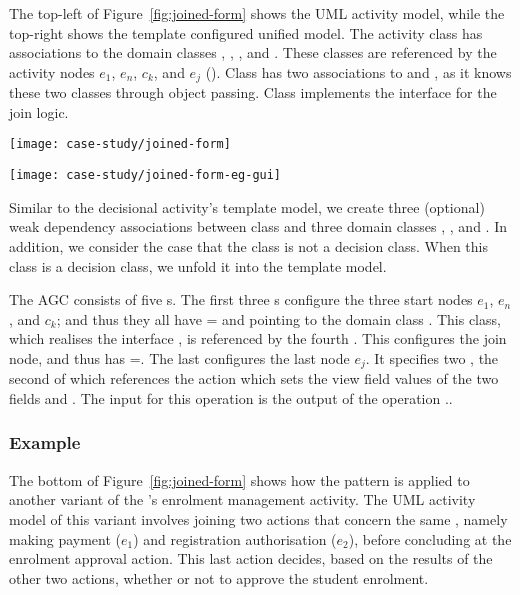 The top-left of Figure~\ref{fig:joined-form} shows the UML activity model, while the top-right shows the template configured unified model. The activity class  has associations to the domain classes , , , and . These classes are referenced by the activity nodes $ e_1 $, $ e_n $, $ c_k $, and $ e_j $ (\resp). Class  has two associations to  and , as it knows these two classes through object passing. Class  implements the interface  for the join logic.

\begin{figure*}[ht]
\begin{center}
\texttt{[image: case-study/joined-form]}
\end{center}
\caption{The joined pattern form.} %
\label{fig:joined-form}
\end{figure*}
%
\begin{figure*}[ht]
\begin{center}
\texttt{[image: case-study/joined-form-eg-gui]}
\end{center}
\caption{The joined pattern form view of enrolment management activity.} %
\label{fig:joined-form-eg-gui}
\end{figure*}

Similar to the decisional activity's template model, we create three (optional) weak dependency associations between class  and three domain classes , , and . In addition, we consider the case that the class  is not a decision class. When this class is a decision class, we unfold it into the template model.

The AGC consists of five s. The first three s configure the three start nodes $ e_1 $, $ e_n $, and $ c_k $; and thus they all have = and  pointing to the domain class . This class, which realises the interface , is referenced by the fourth . This  configures the join node, and thus has =. The last  configures the last node $ e_j $. It specifies two , the second of which references the action   which sets the view field values of the two fields  and . The input for this operation is the output of the operation ..
%
\subsubsection*{Example}
The bottom of Figure~\ref{fig:joined-form} shows how the pattern is applied to another variant of the \courseman's enrolment management activity. The UML activity model of this variant involves joining two actions that concern the same , namely making payment ($e_1$) and registration authorisation ($e_2$), before concluding at the enrolment approval action. This last action decides, based on the results of the other two actions, whether or not to approve the student enrolment.

